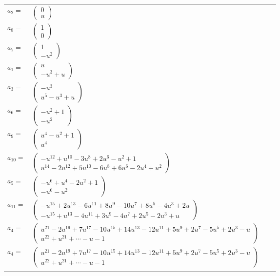 \documentclass[1p]{elsarticle_modified}
\theoremstyle{definition}
\begin{document}
\begin{tabular}{m{7pt} m{180pt} m{7pt} m{180pt} }
\flushright $a_{2}=$&$\begin{pmatrix}0\\u\end{pmatrix}$ \\
\flushright $a_{8}=$&$\begin{pmatrix}1\\0\end{pmatrix}$ \\
\flushright $a_{7}=$&$\begin{pmatrix}1\\- u^2\end{pmatrix}$ \\
\flushright $a_{1}=$&$\begin{pmatrix}u\\- u^3+u\end{pmatrix}$ \\
\flushright $a_{3}=$&$\begin{pmatrix}- u^3\\u^5- u^3+u\end{pmatrix}$ \\
\flushright $a_{6}=$&$\begin{pmatrix}- u^2+1\\- u^2\end{pmatrix}$ \\
\flushright $a_{9}=$&$\begin{pmatrix}u^4- u^2+1\\u^4\end{pmatrix}$ \\
\flushright $a_{10}=$&$\begin{pmatrix}- u^{12}+u^{10}-3 u^8+2 u^6- u^2+1\\u^{14}-2 u^{12}+5 u^{10}-6 u^8+6 u^6-2 u^4+u^2\end{pmatrix}$ \\
\flushright $a_{5}=$&$\begin{pmatrix}- u^6+u^4-2 u^2+1\\- u^6- u^2\end{pmatrix}$ \\
\flushright $a_{11}=$&$\begin{pmatrix}- u^{15}+2 u^{13}-6 u^{11}+8 u^9-10 u^7+8 u^5-4 u^3+2 u\\- u^{15}+u^{13}-4 u^{11}+3 u^9-4 u^7+2 u^5-2 u^3+u\end{pmatrix}$ \\
\flushright $a_{4}=$&$\begin{pmatrix}u^{21}-2 u^{19}+7 u^{17}-10 u^{15}+14 u^{13}-12 u^{11}+5 u^9+2 u^7-5 u^5+2 u^3- u\\u^{22}+u^{21}+\cdots- u-1\end{pmatrix}$\\ \flushright $a_{4}=$&$\begin{pmatrix}u^{21}-2 u^{19}+7 u^{17}-10 u^{15}+14 u^{13}-12 u^{11}+5 u^9+2 u^7-5 u^5+2 u^3- u\\u^{22}+u^{21}+\cdots- u-1\end{pmatrix}$\\&\end{tabular}
\end{document}
